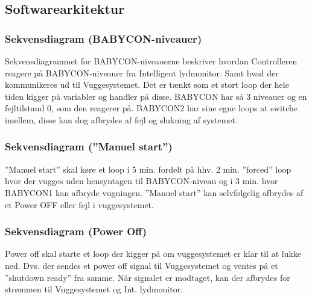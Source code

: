 \subsection{Softwarearkitektur}

\subsubsection{Sekvensdiagram (BABYCON-niveauer)}


Sekvensdiagrammet for BABYCON-niveauerne beskriver hvordan Controlleren reagere på BABYCON-niveauer fra Intelligent lydmonitor. Samt hvad der kommunikeres ud til Vuggesystemet.
Det er tænkt som et stort loop der hele tiden kigger på variabler og handler på disse. BABYCON har så 3 niveauer og en fejltilstand 0, som den reagerer på. BABYCON2 har sine egne loops at switche imellem, disse kan dog afbrydes af fejl og slukning af systemet.

\subsubsection{Sekvensdiagram (''Manuel start'')}


''Manuel start'' skal køre et loop i 5 min. fordelt på hhv. 2 min. ''forced'' loop hvor der vugges uden hensyntagen til BABYCON-niveau og i 3 min. hvor BABYCON1 kan afbryde vugningen. ''Manuel start'' kan selvfølgelig afbrydes af et Power OFF eller fejl i vuggesystemet.

\subsubsection{Sekvensdiagram (Power Off)}


Power off skal starte et loop der kigger på om vuggesystemet er klar til at lukke ned. Dvs. der sendes et power off signal til Vuggesystemet og ventes på et ''shutdown ready'' fra samme. Når signalet er modtaget, kan der afbrydes for strømmen til Vuggesystemet og Int. lydmonitor.  
